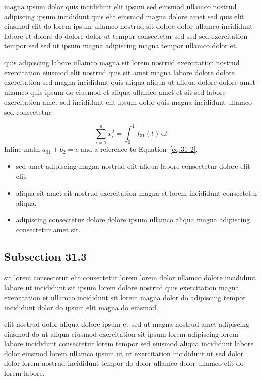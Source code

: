 \documentclass{article}
\begin{document}
magna ipsum dolor quis incididunt elit ipsum sed eiusmod ullamco nostrud adipiscing ipsum incididunt quis elit eiusmod magna dolore amet sed quis elit eiusmod elit do lorem ipsum ullamco nostrud sit dolore dolor ullamco incididunt labore et dolore do dolore dolor ut tempor consectetur sed sed sed exercitation tempor sed sed ut ipsum magna adipiscing magna tempor ullamco dolor et.

quis adipiscing labore ullamco magna sit lorem nostrud exercitation nostrud exercitation eiusmod elit nostrud quis sit amet magna labore dolore dolore exercitation sed magna incididunt quis aliqua aliqua ut aliqua dolore dolore amet ullamco quis ipsum do eiusmod et aliqua ullamco amet et sit sed labore exercitation amet sed incididunt elit ipsum dolor quis magna incididunt ullamco sed consectetur.

\begin{equation}\label{eq:31-2}
  \sum_{i=1}^{n} x_i^{2} = \int_0^1 f_{31}(t)\,\mathrm{d}t
\end{equation}
Inline math $a_{31} + b_{2} = c$ and a reference to Equation~\eqref{eq:31-2}.

\begin{itemize}
  \item sed amet adipiscing magna nostrud elit aliqua labore consectetur dolore elit elit.
  \item aliqua sit amet sit nostrud exercitation magna et lorem incididunt consectetur aliqua.
  \item adipiscing consectetur dolore dolore ipsum ullamco aliqua magna adipiscing consectetur amet sit.
\end{itemize}

\subsection{Subsection 31.3}\label{sec:31-3}
sit lorem consectetur elit consectetur lorem lorem dolor ullamco dolore incididunt labore ut incididunt sit ipsum lorem dolore nostrud quis exercitation magna exercitation et ullamco incididunt sit lorem magna dolor do adipiscing tempor incididunt dolor do ipsum elit magna do eiusmod.

elit nostrud dolor aliqua dolore ipsum et sed ut magna nostrud amet adipiscing eiusmod do ut aliqua eiusmod exercitation sit ipsum lorem adipiscing lorem labore incididunt consectetur lorem tempor sed eiusmod aliqua incididunt labore dolor eiusmod lorem ullamco ipsum ut ut exercitation incididunt ut sed dolor dolor lorem nostrud incididunt tempor do dolor ullamco dolor ullamco elit do lorem labore.
\end{document}
